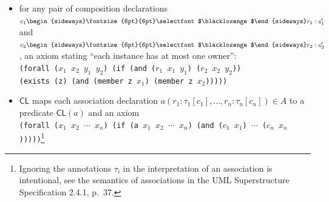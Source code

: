 \documentclass[10pt,fleqn,%
\ifpretendfinal
final%
\else
draft%
\fi,
]{scrreprt}
\newcommand*{\CL}{\ensuremath{\mathsf{CL}}\xspace}
\newcommand{\composition}{\raisebox{0.2pt}{\begin{sideways}\fontsize{6pt}{6pt}\selectfont$\blacklozenge$\end{sideways}}}
\newcommand{\white}[1]{{\color{white}{#1}}}
\newcommand{\qqquad}{\white{x}\qquad}
\begin{document}
\begin{itemize}
  \item 
for any pair of composition declarations $c_1\composition r_1 : c_1'$
and $c_2\composition r_2 : c_2'$, an axiom stating ``each instance has
at most one owner'':\\
\texttt{(forall ($x_1$ $x_2$ $y_1$ $y_2$) (if (and ($r_1$ $x_1$ $y_1$) ($r_2$ $x_2$ $y_2$))}\\
\qqquad\texttt{(exists (z) (and (member z $x_1$) (member z $x_2$)))))}
  \item \CL maps each association declaration $a(r_1 : \tau_1[c_1], \dots, r_n : \tau_n[c_n])\in A$ to a predicate $\CL(a)$ and an axiom\\
\texttt{(forall ($x_1$ $x_2$ $\cdots$  $x_n$) (if (a $x_1$ $x_2$ $\cdots$  $x_n$) (and ($c_1$ $x_1$) $\cdots$ ($c_n$ $x_n$)))))}\footnote{
Ignoring the annotations $\tau_i$ in the interpretation of an
association is intentional, see the semantics of associations in the UML
Superstructure Specification 2.4.1, p.~37.}
\end{itemize}
\end{document}
